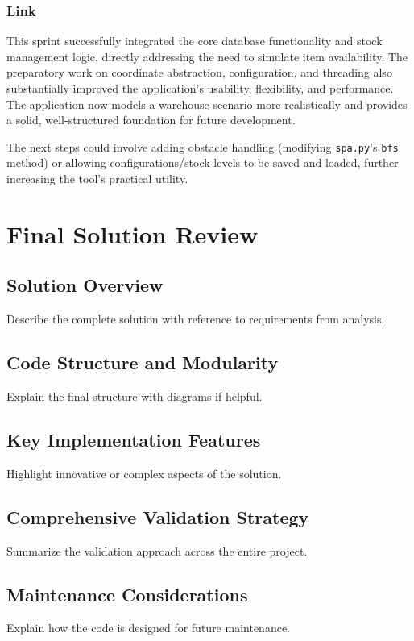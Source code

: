 \subsubsection{Link}
This sprint successfully integrated the core database functionality and stock management logic, directly addressing the need to simulate item availability. The preparatory work on coordinate abstraction, configuration, and threading also substantially improved the application's usability, flexibility, and performance. The application now models a warehouse scenario more realistically and provides a solid, well-structured foundation for future development.

The next steps could involve adding obstacle handling (modifying \verb|spa.py|'s \verb|bfs| method) or allowing configurations/stock levels to be saved and loaded, further increasing the tool's practical utility.

\newpage


\section{Final Solution Review}

\subsection{Solution Overview}
Describe the complete solution with reference to requirements from analysis.

\subsection{Code Structure and Modularity}
Explain the final structure with diagrams if helpful.

\subsection{Key Implementation Features}
Highlight innovative or complex aspects of the solution.

\subsection{Comprehensive Validation Strategy}
Summarize the validation approach across the entire project.

\subsection{Maintenance Considerations}
Explain how the code is designed for future maintenance.

